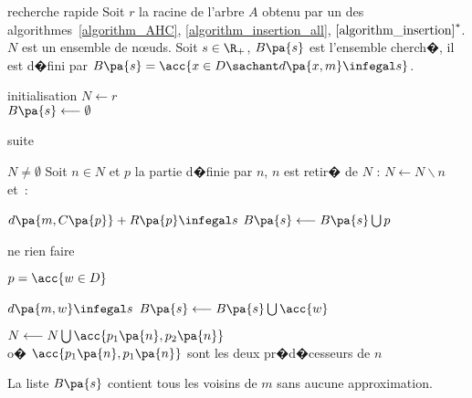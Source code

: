         \begin{xalgorithm}{recherche rapide}\label{algorithm_optimisation}%
        Soit $r$ la racine de l'arbre $A$ obtenu par un des algorithmes~\ref{algorithm_AHC},
        \ref{algorithm_insertion_all},
        $\ref{algorithm_insertion}^*$. $N$ est un ensemble de n\oe uds. Soit $s \in \R_+$, $B\pa{s}$ est 
        l'ensemble cherch�, il est d�fini par $B\pa{s} = \acc{ x \in D \sachant d\pa{x,m} \infegal s }$.
        
        \begin{xalgostep}{initialisation}
            $N \longleftarrow r$ \\
            $B\pa{s} \longleftarrow \emptyset$
        \end{xalgostep}
        
        \begin{xalgostep}{suite}\label{space_algo_step_B}
            \begin{xwhile}{$N \neq \emptyset$}
                Soit $n \in N$ et $p$ la partie d�finie par $n$, $n$ est retir� de $N$ : 
                                            $N \longleftarrow N \backslash n$
                et~: \\
                \begin{xif}{$d\pa{m, C\pa{p}} + R\pa{p}\infegal s $}
                    $B\pa{s} \longleftarrow B\pa{s} \bigcup p$
                    
                                ne rien faire
                \xelse
                    \begin{xif}{$p = \acc{ w \in D}$}
                            \begin{xif}{$d\pa{m, w} \infegal s$}
                                $B\pa{s} \longleftarrow B\pa{s} \bigcup \acc{w}$
                            \end{xif}
                    \xelse
                        $N \longleftarrow N \bigcup \acc{p_1\pa{n},p_2\pa{n}}$\\
                        o� $\acc{p_1\pa{n},p_1\pa{n}}$ sont les deux pr�d�cesseurs de $n$
                    \end{xif}
                \end{xif}
            \end{xwhile}
        \end{xalgostep} 
        
        La liste $B\pa{s}$ contient tous les voisins de $m$ sans aucune approximation.
        \end{xalgorithm}


